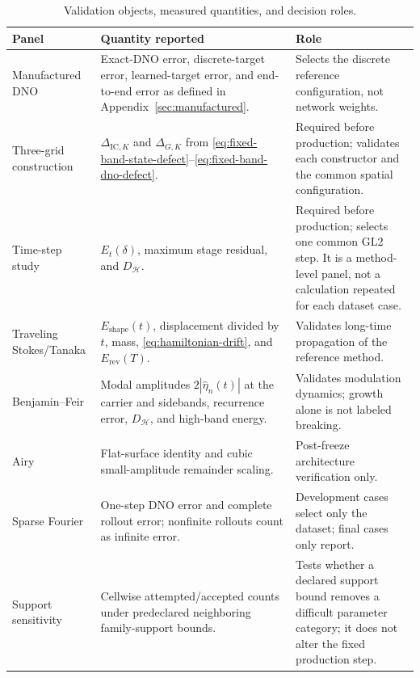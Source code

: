 \documentclass[11pt]{article}
\begin{document}
\begin{table}[ht]
  \centering
  \caption{Validation objects, measured quantities, and decision roles.}
  \label{tab:validation-roles}
  \small
  \begin{tabularx}{\textwidth}{
    @{}>{\raggedright\arraybackslash}p{}
       >{\raggedright\arraybackslash}X
       >{\raggedright\arraybackslash}p{}@{}}
    \toprule
    Panel & Quantity reported & Role \\
    \midrule
    Manufactured DNO
      & Exact-DNO error, discrete-target error, learned-target error, and
        end-to-end error as defined in Appendix~\ref{sec:manufactured}.
      & Selects the discrete reference configuration, not network weights. \\
    Three-grid construction
      & $\Delta_{\mathrm{IC},K}$ and $\Delta_{G,K}$ from
        \eqref{eq:fixed-band-state-defect}--\eqref{eq:fixed-band-dno-defect}.
      & Required before production; validates each constructor and the common
        spatial configuration. \\
    Time-step study
      & $E_t(\delta)$, maximum stage residual, and $D_{\mathcal H}$.
      & Required before production; selects one common GL2 step.  It is a
        method-level panel, not a calculation repeated for each dataset case. \\
    Traveling Stokes/Tanaka
      & $E_{\mathrm{shape}}(t)$, displacement divided by $t$, mass,
        \eqref{eq:hamiltonian-drift}, and $E_{\mathrm{rev}}(T)$.
      & Validates long-time propagation of the reference method. \\
    Benjamin--Feir
      & Modal amplitudes $2|\widehat\eta_n(t)|$ at the carrier and sidebands,
        recurrence error, $D_{\mathcal H}$, and high-band energy.
      & Validates modulation dynamics; growth alone is not labeled breaking. \\
    Airy
      & Flat-surface identity and cubic small-amplitude remainder scaling.
      & Post-freeze architecture verification only. \\
    Sparse Fourier
      & One-step DNO error and complete rollout error; nonfinite rollouts
        count as infinite error.
      & Development cases select only the dataset; final cases only report. \\
    Support sensitivity
      & Cellwise attempted/accepted counts under predeclared neighboring
        family-support bounds.
      & Tests whether a declared support bound removes a difficult parameter
        category; it does not alter the fixed production step. \\
    \bottomrule
  \end{tabularx}
\end{table}
\end{document}
